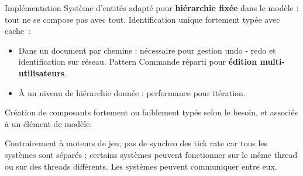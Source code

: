 \begin{block}{Implémentation}
Système d'entités adapté pour \textbf{hiérarchie fixée} dans le modèle : tout ne se compose pas avec tout.
Identification unique fortement typée avec cache~: 
\begin{itemize}
    \item Dans un document par chemins : nécessaire pour gestion undo - redo et identification sur réseau.
    Pattern Commande réparti pour \textbf{édition multi-utilisateurs}.
    \item À un niveau de hiérarchie donnée : performance pour itération.
   \end{itemize}

Création de composants fortement ou faiblement typés selon le besoin, et associés à un élément de modèle.

Contrairement à moteurs de jeu, pas de synchro des tick rate car tous les systèmes sont séparés ; certains systèmes peuvent fonctionner sur le même thread ou sur des threads différents. 
Les systèmes peuvent communiquer entre eux.
\end{block}
